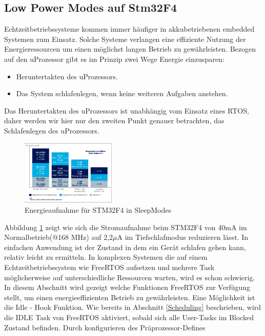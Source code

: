 \subsection{Low Power Modes auf Stm32F4}
\label{sec:Low Power Modes}
Echtzeitbetriebssysteme kommen immer häufiger in akkubetriebenen embedded Systemen zum Einsatz. Solche Systeme verlangen eine effiziente Nutzung der Energieressourcen um einen möglichst langen Betrieb zu gewährleisten. Bezogen auf den uProzessor gibt es im Prinzip zwei Wege Energie einzusparen:
\begin{itemize}
	\item Heruntertakten des uProzessors.
	\item Das System schlafenlegen, wenn keine weiteren Aufgaben anstehen.
\end{itemize}
Das Heruntertakten des uProzessors ist unabhängig vom Einsatz eines RTOS, daher werden wir hier nur den zweiten Punkt genauer betrachten, das Schlafenlegen des uProzessors. 
\begin{figure}[htb!]
	\centering
		\includegraphics[width=0.4\textwidth]{Pictures/STM32F4/powerConsumption.png}
	\caption{Energieaufnahme für STM32F4 in SleepModes}
	\label{fig:powerconsum}
\end{figure}
Abbildung \ref{fig:powerconsum} zeigt wie sich die Stromaufnahme beim STM32F4 von 40mA im Normalbetrieb(@168 MHz) auf 2,2$\mu$A im Tiefschlafmodus reduzieren lässt. 
In einfachen Anwendung ist der Zustand in dem ein Gerät schlafen gehen kann, relativ leicht zu ermitteln. In komplexen Systemen die auf einem Echtzeitbetriebssystem wie FreeRTOS aufsetzen und mehrere Task mög\-li\-cherweise auf unterschiedliche Ressourcen warten, wird es schon schwierig. In diesem Abschnitt wird gezeigt welche Funktionen FreeRTOS zur Ver\-fü\-gung stellt, um einen energieeffizienten Betrieb zu gewährleisten. Eine Mög\-lich\-keit ist die Idle - Hook Funktion. Wie bereits in Abschnitt \ref{Scheduling} beschrieben, wird die IDLE Task von FreeRTOS aktiviert, sobald sich alle User-Tasks im Blocked Zustand befinden. Durch konfigurieren des Präprozessor-Defines        
